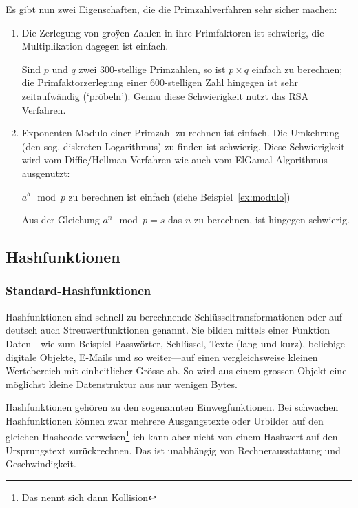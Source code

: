 Es gibt nun zwei Eigenschaften, die die Primzahlverfahren sehr sicher machen:
\begin{enumerate}
    \item Die Zerlegung von groÿen Zahlen in ihre Primfaktoren ist schwierig,
    die Multiplikation dagegen ist einfach.

    Sind $p$ und $q$ zwei 300-stellige Primzahlen, so ist $p\times q$ einfach
    zu berechnen; die Primfaktorzerlegung einer 600-stelligen Zahl hingegen
    ist sehr zeitaufwändig (`pröbeln'). Genau diese Schwierigkeit nutzt
    das RSA Verfahren.

    \item Exponenten Modulo einer Primzahl zu rechnen ist einfach.
    Die Umkehrung (den sog. diskreten Logarithmus) zu finden ist schwierig.
    Diese Schwierigkeit wird vom Diffie/Hellman-Verfahren wie auch vom
    ElGamal-Algorithmus ausgenutzt:

    $a^b \mod p$ zu berechnen ist einfach (siehe Beispiel~\ref{ex:modulo})

    Aus der Gleichung $a^n \mod p = s$ das $n$ zu berechnen, ist hingegen schwierig.
\end{enumerate}

\subsection{Hashfunktionen}
\label{subsec:hash}

\subsubsection*{Standard-Hashfunktionen}

Hashfunktionen sind schnell zu berechnende Schlüsseltransformationen oder
auf deutsch auch Streuwertfunktionen genannt. Sie bilden mittels einer
Funktion Daten---wie zum Beispiel Passwörter, Schlüssel, Texte (lang
und kurz), beliebige digitale Objekte, E-Mails und so weiter---auf
einen vergleichsweise kleinen Wertebereich mit einheitlicher Grösse
ab. So wird aus einem grossen Objekt eine möglichst kleine Datenstruktur
aus nur wenigen Bytes.

Hashfunktionen gehören zu den sogenannten Einwegfunktionen. Bei
schwachen Hashfunktionen können zwar mehrere Ausgangstexte oder
Urbilder auf den gleichen Hashcode verweisen\footnote{Das nennt sich dann
Kollision} ich kann aber nicht von einem Hashwert auf den
Ursprungstext zurückrechnen. Das ist unabhängig von Rechnerausstattung
und Geschwindigkeit.

